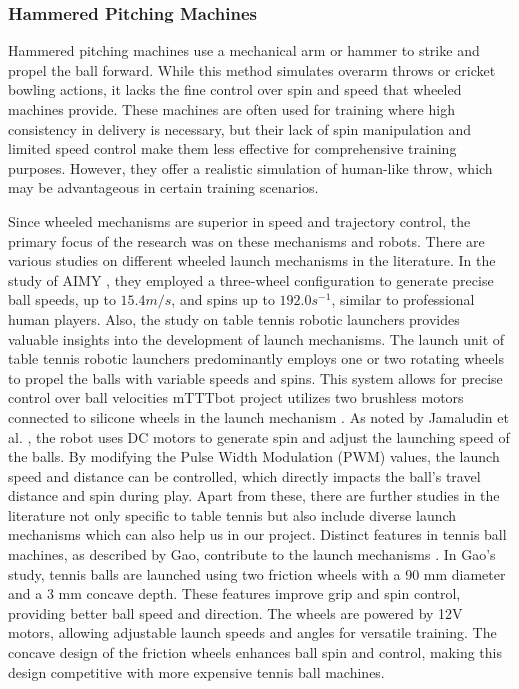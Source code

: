 \documentclass[12pt]{article}
\newenvironment{indentedsection}{
    \setlength{\parindent}{1cm} %
    \setlength{\leftskip}{1cm} %
}{}
\begin{document}
\begin{indentedsection}
\subsubsection{Hammered Pitching Machines}

Hammered pitching machines use a mechanical arm or hammer to strike and propel the ball forward. While this method simulates overarm throws or cricket bowling actions, it lacks the fine control over spin and speed that wheeled machines provide. These machines are often used for training where high consistency in delivery is necessary, but their lack of spin manipulation and limited speed control make them less effective for comprehensive training purposes. However, they offer a realistic simulation of  human-like throw, which may be advantageous in certain training scenarios. \\

\end{indentedsection}

Since wheeled mechanisms are superior in speed and trajectory control, the primary focus of the research was on these mechanisms and robots. There are various studies on different wheeled launch mechanisms in the literature. In the study of AIMY \cite{Dittrich2023}, they employed a three-wheel configuration to generate precise ball speeds, up to $15.4 m/s$, and spins up to $192.0 s^{-1}$, similar to professional human players.  Also, the study on table tennis robotic launchers \cite{Jamaludin2022} provides valuable insights into the development of launch mechanisms. The launch unit of table tennis robotic launchers predominantly employs one or two rotating wheels to propel the balls with variable speeds and spins. This system allows for precise control over ball velocities mTTTbot project utilizes two brushless motors connected to silicone wheels in the launch mechanism \cite{Tasci2023}. As noted by Jamaludin et al. \cite{Jamaludin2022}, the robot uses DC motors to generate spin and adjust the launching speed of the balls. By modifying the Pulse Width Modulation (PWM) values, the launch speed and distance can be controlled, which directly impacts the ball’s travel distance and spin during play. Apart from these, there are further studies in the literature not only specific to table tennis but also include diverse launch mechanisms which can also help us in our project. Distinct features in tennis ball machines, as described by Gao, contribute to the launch mechanisms \cite{Gao2019}. In Gao’s study, tennis balls are launched using two friction wheels with a 90 mm diameter and a 3 mm concave depth. These features improve grip and spin control, providing better ball speed and direction. The wheels are powered by 12V motors, allowing adjustable launch speeds and angles for versatile training. The concave design of the friction wheels enhances ball spin and control, making this design competitive with more expensive tennis ball machines.
\end{document}
